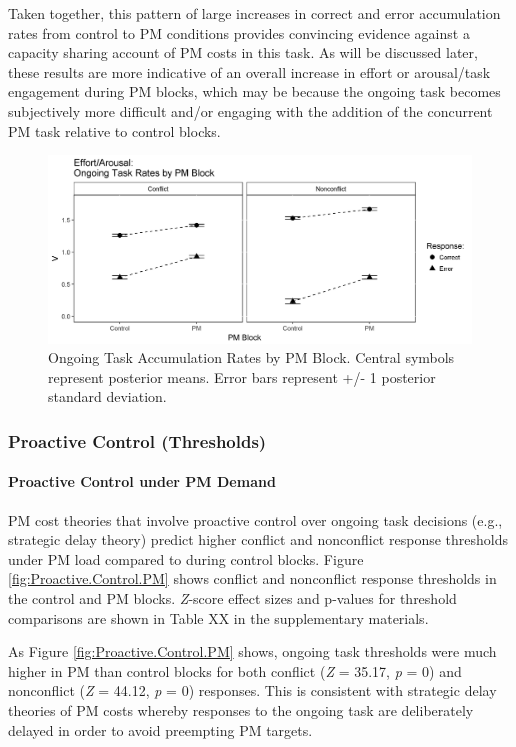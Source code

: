 \documentclass[11pt,]{article}
\let\oldparagraph\paragraph
\renewcommand{\paragraph}[1]{\oldparagraph{#1}\mbox{}}
\begin{document}
Taken together, this pattern of large increases in correct and error
accumulation rates from control to PM conditions provides convincing
evidence against a capacity sharing account of PM costs in this task. As
will be discussed later, these results are more indicative of an overall
increase in effort or arousal/task engagement during PM blocks, which
may be because the ongoing task becomes subjectively more difficult
and/or engaging with the addition of the concurrent PM task relative to
control blocks.

\begin{figure}
\includegraphics[width=0.8\linewidth]{figures/E1/E1.Effort.Arousal.PM} \caption{\label{fig:Effort.Arousal.PM}Ongoing Task Accumulation Rates by PM Block. Central symbols represent posterior means. Error bars represent +/- 1 posterior standard deviation.}\label{fig:Plot: Capacity PM}
\end{figure}

\subsubsection{Proactive Control
(Thresholds)}\label{proactive-control-thresholds}

\paragraph{Proactive Control under PM
Demand}\label{proactive-control-under-pm-demand}

PM cost theories that involve proactive control over ongoing task
decisions (e.g., strategic delay theory) predict higher conflict and
nonconflict response thresholds under PM load compared to during control
blocks. Figure \ref{fig:Proactive.Control.PM} shows conflict and
nonconflict response thresholds in the control and PM blocks.
\emph{Z}-score effect sizes and p-values for threshold comparisons are
shown in Table XX in the supplementary materials.

As Figure \ref{fig:Proactive.Control.PM} shows, ongoing task thresholds
were much higher in PM than control blocks for both conflict (\emph{Z} =
35.17, \emph{p} = 0) and nonconflict (\emph{Z} = 44.12, \emph{p} = 0)
responses. This is consistent with strategic delay theories of PM costs
whereby responses to the ongoing task are deliberately delayed in order
to avoid preempting PM targets.
\end{document}
